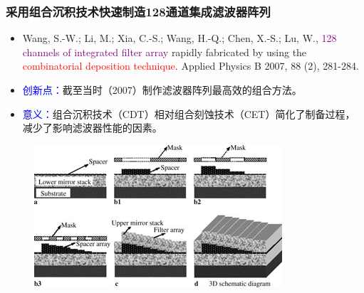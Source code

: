 \begin{frame}[c]
    \frametitle{采用组合沉积技术快速制造128通道集成滤波器阵列}
    \begin{itemize}
        \item Wang, S.-W.;  Li, M.;  Xia, C.-S.;  Wang, H.-Q.;  Chen, X.-S.; Lu, W., \textcolor{purple}{128 channels of integrated filter array} rapidly fabricated by using the \textcolor{red}{combinatorial deposition technique}. Applied Physics B 2007, 88 (2), 281-284.
        \item \textcolor{blue}{创新点：}截至当时（2007）制作滤波器阵列最高效的组合方法。
        \item \textcolor{blue}{意义：}组合沉积技术（CDT）相对组合刻蚀技术（CET）简化了制备过程，减少了影响滤波器性能的因素。
    \end{itemize}
    \begin{figure}[H] %
        \centering %
        \includegraphics[width=1.\textwidth]{figures/128 channels of integrated filter array rapidly fabricated by using the combinatorial deposition technique_1.png} %
    \end{figure}
\end{frame}

